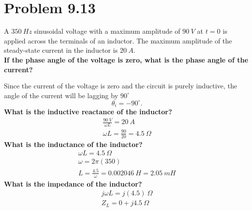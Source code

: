 \documentclass[12pt]{article}
\begin{document}
    \section*{Problem 9.13}
    A $350\ Hz$ sinusoidal voltage with a maximum amplitude of $90\ V$ at $t =
    0$ is applied across the terminals of an inductor. The maximum amplitude of
    the steady-state current in the inductor is $20\ A$. \\
    \textbf{If the phase angle of the voltage is zero, what is the phase angle
    of the current?} \\
    \par Since the current of the voltage is zero and the circuit is purely
    inductive, the angle of the current will be lagging by $90^{\circ}$
    \[
        \boxed{\theta_{i} = -90^{\circ}}
    .\]
    \textbf{What is the inductive reactance of the inductor?}
    \begin{gather*}
        \frac{90\ V}{\omega L} = 20\ A \\
        \omega L = \frac{90}{20} = \boxed{4.5\ \Omega}
    \end{gather*}
    \textbf{What is the inductance of the inductor?}
    \begin{gather*}
        \omega L = 4.5\ \Omega \\
        \omega = 2 \pi (350) \\
        L = \frac{4.5}{\omega} =  0.002046\ H = \boxed{2.05\ mH}
    \end{gather*}
    \textbf{What is the impedance of the inductor?}
    \begin{gather*}
        j \omega L = j (4.5)\ \Omega \\
        \boxed{Z_{L} = 0 + j4.5\ \Omega}
    \end{gather*}
\end{document}
